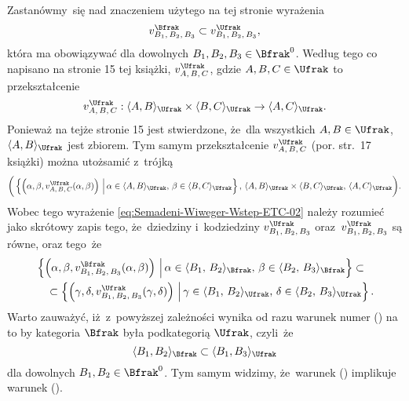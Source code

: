 \noindent
{} Zastanówmy~się nad znaczeniem użytego na tej stronie wyrażenia
\begin{equation}
  \label{eq:Semadeni-Wiweger-Wstep-ETC-02}
  v_{ B_{ 1 }, \, B_{ 2 }, \, B_{ 3 } }^{ \Bfrak } \subset
  v_{ B_{ 1 }, \, B_{ 2 }, \, B_{ 3 } }^{ \Ufrak },
\end{equation}
która ma obowiązywać dla dowolnych $B_{ 1 }, B_{ 2 }, B_{ 3 } \in \Bfrak^{ 0 }$.
Według tego co napisano na stronie 15 tej książki,
$v_{ A, \, B, \, C }^{ \Ufrak }$, gdzie $A, B, C \in \Ufrak$ to przekształcenie
\begin{equation}
  \label{eq:Semadeni-Wiweger-Wstep-ETC-03}
  v_{ A, \, B, \, C }^{ \Ufrak } :
  \langle A, B \rangle_{ \Ufrak } \times \langle B, C \rangle_{ \Ufrak } \to
  \langle A, C \rangle_{ \Ufrak }.
\end{equation}
Ponieważ na tejże stronie 15 jest stwierdzone, że~dla wszystkich
$A, B \in \Ufrak$, $\langle A, B \rangle_{ \Ufrak }$ jest zbiorem. Tym samym przekształcenie
$v_{ A, \, B, \, C }^{ \Ufrak }$ (por. str.~17 książki) można utożsamić z~trójką
\begin{equation}
  \label{eq:Semadeni-Wiweger-Wstep-ETC-04}
  \bigg( \left\{ \left(\alpha, \beta, v_{ A, \, B, \, C }^{ \Ufrak }( \alpha, \beta )
    \right) \, \Big| \,
    \alpha \in \langle A, B \rangle_{ \Ufrak }, \, \beta \in \langle B, C \rangle_{ \Ufrak } \right\}, \,
  \langle A, B \rangle_{ \Ufrak } \times \langle B, C \rangle_{ \Ufrak }, \,
  \langle A, C \rangle_{ \Ufrak } \bigg).
\end{equation}
Wobec tego wyrażenie \eqref{eq:Semadeni-Wiweger-Wstep-ETC-02} należy rozumieć
jako skrótowy zapis tego, że~dziedziny i~kodziedziny
$v_{ B_{ 1 }, \, B_{ 2 }, \, B_{ 3 } }^{ \Ufrak }$
oraz~$v_{ B_{ 1 }, \, B_{ 2 }, \, B_{ 3 } }^{ \Ufrak }$ są równe, oraz tego~że
\begin{equation}
  \label{eq:Semadeni-Wiweger-Wstep-ETC-05}
  \begin{split}
    &\left\{ \left( \alpha, \beta,
      v_{ B_{ 1 }, \, B_{ 2 }, \, B_{ 3 } }^{ \Bfrak }( \alpha, \beta )
      \right)
      \, \Big| \,
      \alpha \in \langle B_{ 1 }, \, B_{ 2 } \rangle_{ \Bfrak }, \,
      \beta \in \langle B_{ 2 }, \, B_{ 3 } \rangle_{ \Bfrak } \right\}
      \subset \\
    &\quad
      \subset
      \left\{ \left( \gamma, \delta,
      v_{ B_{ 1 }, \, B_{ 2 }, \, B_{ 3 } }^{ \Ufrak }( \gamma, \delta )
      \right)
      \, \Big| \,
      \gamma \in \langle B_{ 1 }, \, B_{ 2 } \rangle_{ \Ufrak }, \,
      \delta \in \langle B_{ 2 }, \, B_{ 3 } \rangle_{ \Ufrak } \right\}.
  \end{split}
\end{equation}
Warto zauważyć, iż~z~powyższej zależności wynika od razu warunek numer
() na to by kategoria $\Bfrak$ była podkategorią $\Ufrak$,
czyli~że
\begin{equation}
  \label{eq:Semadeni-Wiweger-Wstep-ETC-06}
  \langle B_{ 1 }, B_{ 2 } \rangle_{ \Bfrak } \subset \langle B_{ 1 }, B_{ 3 } \rangle_{ \Ufrak }
\end{equation}
dla dowolnych $B_{ 1 }, B_{ 2 } \in \Bfrak^{ 0 }$. Tym samym widzimy,
że~warunek () implikuje warunek ().

